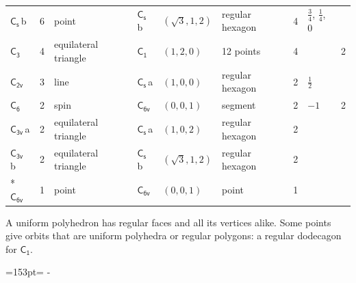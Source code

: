 \documentclass[10pt,a4paper]{article}
\newcommand{\needspace}[1]{\par\penalty-100\begingroup\dimen0=#1\relax\dimen2=\pagegoal
  \advance\dimen2-\pagetotal\ifdim\dimen0>\dimen2\relax\ifdim\dimen2>0pt\vfil\break\fi\fi
  \endgroup}
\numberwithin{equation}{section}
\newcommand{\grp}[1]{\mathsf{#1}}
\newcommand{\clsletter}[1]{\,{\scriptsize\color{black!55}#1}}
\newlength{\fillwidth}\newlength{\cellwidth}\newlength{\colwidth}
\begin{document}
{{\begin{longtable}{@{}lrllllr>{\RaggedRight\arraybackslash}p{\fillwidth}r@{}}
\href{C1v.pdf}{$\grp{C_{s}}$}\clsletter{b} & 6 & point & \href{C1v.pdf}{$\grp{C_{s}}$}\clsletter{b} & $(\sqrt{3}, 1, 2)$ & regular hexagon & 4 & ${\tfrac{3}{4}}$, ${\tfrac{1}{4}}$, ${0}$ & \\
\href{C3.pdf}{$\grp{C_{3}}$} & 4 & equilateral triangle & \href{C1.pdf}{$\grp{C_{1}}$} & $(1, 2, 0)$ & 12 points & 4 &  & 2\\
\href{C2v.pdf}{$\grp{C_{2v}}$} & 3 & line & \href{C1v.pdf}{$\grp{C_{s}}$}\clsletter{a} & $(1, 0, 0)$ & regular hexagon & 2 & ${\tfrac{1}{2}}$ & \\
\href{C6.pdf}{$\grp{C_{6}}$} & 2 & spin & \href{C6v.pdf}{$\grp{C_{6v}}$} & $(0, 0, 1)$ & segment & 2 & ${-1}$ & 2\\
\href{C3v.pdf}{$\grp{C_{3v}}$}\clsletter{a} & 2 & equilateral triangle & \href{C1v.pdf}{$\grp{C_{s}}$}\clsletter{a} & $(1, 0, 2)$ & regular hexagon & 2 &  & \\
\href{C3v.pdf}{$\grp{C_{3v}}$}\clsletter{b} & 2 & equilateral triangle & \href{C1v.pdf}{$\grp{C_{s}}$}\clsletter{b} & $(\sqrt{3}, 1, 2)$ & regular hexagon & 2 &  & \\*
\href{C6v.pdf}{$\grp{C_{6v}}$} & 1 & point & \href{C6v.pdf}{$\grp{C_{6v}}$} & $(0, 0, 1)$ & point & 1 &  & \\
\bottomrule\end{longtable}}}
A uniform polyhedron has regular faces and all its vertices alike. Some points give orbits that are uniform polyhedra or regular polygons: a regular dodecagon for \href{C1.pdf}{$\grp{C_{1}}$}.
\needspace{153pt}
\end{document}
